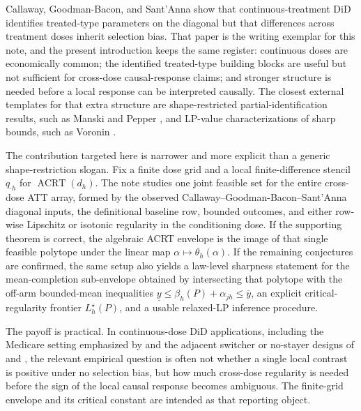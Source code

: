 \documentclass[11pt]{article}
\theoremstyle{definition}
\theoremstyle{plain}
\theoremstyle{remark}
\begin{document}
Callaway, Goodman-Bacon, and Sant'Anna \cite{CallawayGoodmanBaconSantAnna2021}
show that continuous-treatment DiD identifies treated-type parameters on the
diagonal but that differences across treatment doses inherit selection bias.
That paper is the writing exemplar for this note, and the present introduction
keeps the same register: continuous doses are economically common; the
identified treated-type building blocks are useful but not sufficient for
cross-dose causal-response claims; and stronger structure is needed before a
local response can be interpreted causally.  The closest external templates
for that extra structure are shape-restricted partial-identification results,
such as Manski and Pepper \cite{ManskiPepper2000}, and LP-value
characterizations of sharp bounds, such as Voronin \cite{Voronin2025}.

The contribution targeted here is narrower and more explicit than a generic
shape-restriction slogan.  Fix a finite dose grid and a local finite-difference
stencil \(q_{\cdot h}\) for \(\operatorname{ACRT}(d_h)\).  The note studies one
joint feasible set for the entire cross-dose ATT array, formed by the observed
Callaway--Goodman-Bacon--Sant'Anna diagonal inputs, the definitional baseline
row, bounded outcomes, and either row-wise Lipschitz or isotonic regularity in
the conditioning dose.  If the supporting theorem is correct, the algebraic
ACRT envelope is the image of that single feasible polytope under the linear
map \(\alpha\mapsto \theta_h(\alpha)\).  If the remaining conjectures are
confirmed, the same setup also yields a law-level sharpness statement for the
mean-completion sub-envelope obtained by intersecting that polytope with the
off-arm bounded-mean inequalities
\(\underline y\le \beta_h(P)+\alpha_{jh}\le\overline y\), an explicit
critical-regularity frontier \(L_h^\star(P)\), and a usable relaxed-LP
inference procedure.

The payoff is practical.  In continuous-dose DiD applications, including the
Medicare setting emphasized by
\cite{CallawayGoodmanBaconSantAnna2021} and the adjacent switcher or no-stayer
designs of \cite{deChaisemartinDHaultfoeuillePasquierSowVazquezBare2022} and
\cite{deChaisemartinDHaultfoeuilleVazquezBare2024}, the relevant empirical
question is often not whether a single local contrast is positive under no
selection bias, but how much cross-dose regularity is needed before the sign
of the local causal response becomes ambiguous.  The finite-grid envelope and
its critical constant are intended as that reporting object.
\end{document}
